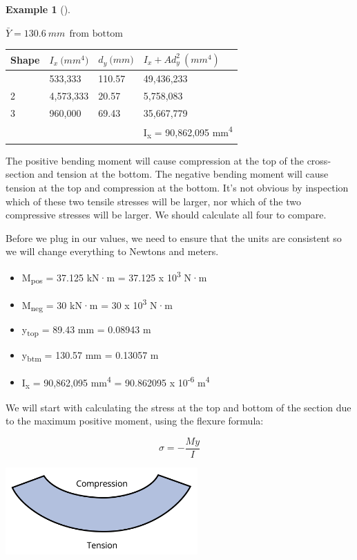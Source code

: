 \documentclass[
  letterpaper,
  DIV=11,
  numbers=noendperiod]{scrreprt}
\theoremstyle{definition}
\newtheorem{example}{Example}[chapter]
\theoremstyle{remark}
\begin{document}
\begin{tcolorbox}
\begin{example}[]
\begin{tcolorbox}
\(\bar{Y}=130.6{~mm}~~\text{from bottom}\)

\begin{longtable}[]{@{}llll@{}}
\toprule\noalign{}
Shape & \(I_x{~(mm^4})\) & \(d_y{~(mm})\) & \(I_x+Ad_y^2{~(mm^4)}\) \\
\midrule\noalign{}
\endhead
\bottomrule\noalign{}
\endlastfoot
1 & 533,333 & 110.57 & 49,436,233 \\
2 & 4,573,333 & 20.57 & 5,758,083 \\
3 & 960,000 & 69.43 & 35,667,779 \\
& & & I\textsubscript{x} = 90,862,095 mm\textsuperscript{4} \\
\end{longtable}

The positive bending moment will cause compression at the top of the
cross-section and tension at the bottom. The negative bending moment
will cause tension at the top and compression at the bottom. It's not
obvious by inspection which of these two tensile stresses will be
larger, nor which of the two compressive stresses will be larger. We
should calculate all four to compare.

Before we plug in our values, we need to ensure that the units are
consistent so we will change everything to Newtons and meters.

\begin{itemize}
\item
  M\textsubscript{pos} = 37.125 kN·m = 37.125 x 10\textsuperscript{3}
  N·m
\item
  M\textsubscript{neg} = 30 kN·m = 30 x 10\textsuperscript{3} N·m
\item
  y\textsubscript{top} = 89.43 mm = 0.08943 m
\item
  y\textsubscript{btm} = 130.57 mm = 0.13057 m
\item
  I\textsubscript{x} = 90,862,095 mm\textsuperscript{4} = 90.862095 x
  10\textsuperscript{-6} m\textsuperscript{4}
\end{itemize}

We will start with calculating the stress at the top and bottom of the
section due to the maximum positive moment, using the flexure formula:

\[ \sigma=-\frac{M y}{I} \]

\begin{center}
\includegraphics[width=2.89583in,height=\textheight]{images/CH9 PNGs/Example 9.2 part 6.png}
\end{center}


\end{tcolorbox}
\end{example}
\end{tcolorbox}
\end{document}
